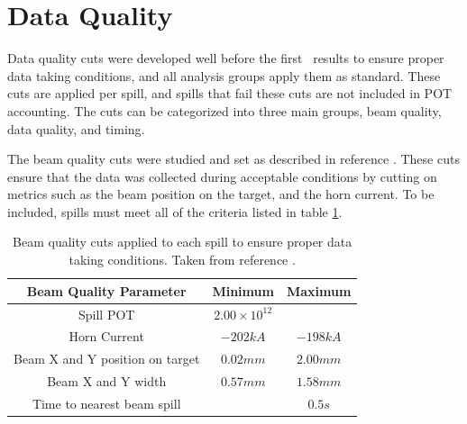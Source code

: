 \section{Data Quality}

Data quality cuts were developed well before the first \nova~results to ensure proper data taking conditions, and all analysis groups apply them as standard. These cuts are applied per spill, and spills that fail these cuts are not included in POT accounting. The cuts can be categorized into three main groups, beam quality, data quality, and timing.

The beam quality cuts were studied and set as described in reference \cite{ref:TNBeamQual}. These cuts ensure that the data was collected during acceptable conditions by cutting on metrics such as the beam position on the target, and the horn current. To be included, spills must meet all of the criteria listed in table \ref{tab:BeamQual}.
\begin{table}[htb]
  \begin{center}
    \caption[Beam Quality Cuts]{Beam quality cuts applied to each spill to ensure proper data taking conditions. Taken from reference \cite{ref:TNBeamQual}.}
    \label{tab:BeamQual}
    \begin{tabular}{c c c}
      \hline\hline
      Beam Quality Parameter & Minimum & Maximum \\
      \hline
      Spill POT & $2.00 \times 10^{12}$ & \\
      Horn Current & $-202\unit{kA}$ & $-198\unit{kA}$ \\
      Beam X and Y position on target & $0.02\unit{mm}$ & $2.00\unit{mm}$ \\
      Beam X and Y width & $0.57\unit{mm}$ & $1.58\unit{mm}$ \\
      Time to nearest beam spill & & $0.5\unit{s}$ \\
      \hline
    \end{tabular}
  \end{center}
\end{table}

